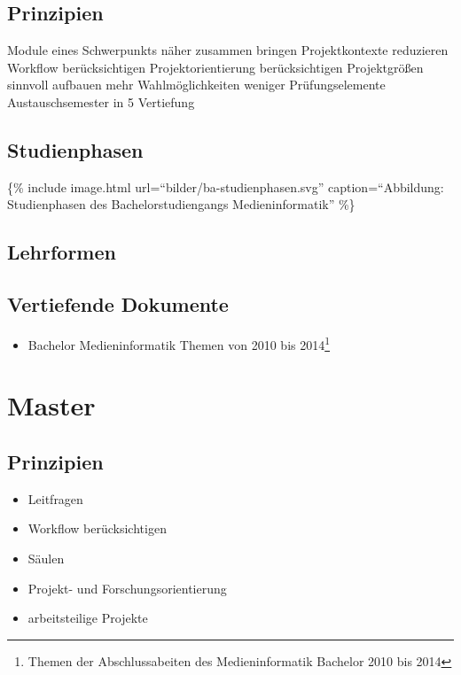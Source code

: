 \subsection{Prinzipien}\label{prinzipien}

Module eines Schwerpunkts näher zusammen bringen Projektkontexte
reduzieren Workflow berücksichtigen Projektorientierung berücksichtigen
Projektgrößen sinnvoll aufbauen mehr Wahlmöglichkeiten weniger
Prüfungselemente Austauschsemester in 5 Vertiefung

\subsection{Studienphasen}\label{studienphasen}

\{\% include image.html url=``bilder/ba-studienphasen.svg''
caption=``Abbildung: Studienphasen des Bachelorstudiengangs
Medieninformatik'' \%\}

\subsection{Lehrformen}\label{lehrformen}

\subsection{Vertiefende Dokumente}\label{vertiefende-dokumente}

\begin{itemize}
\tightlist
\item
  Bachelor Medieninformatik Themen von 2010 bis 2014\footnote{Themen der
    Abschlussabeiten des Medieninformatik Bachelor 2010 bis 2014}
\end{itemize}

\section{Master}\label{master}

\subsection{Prinzipien}\label{prinzipien-1}

\begin{itemize}
\tightlist
\item
  Leitfragen
\item
  Workflow berücksichtigen
\item
  Säulen
\item
  Projekt- und Forschungsorientierung
\item
  arbeitsteilige Projekte
\end{itemize}

